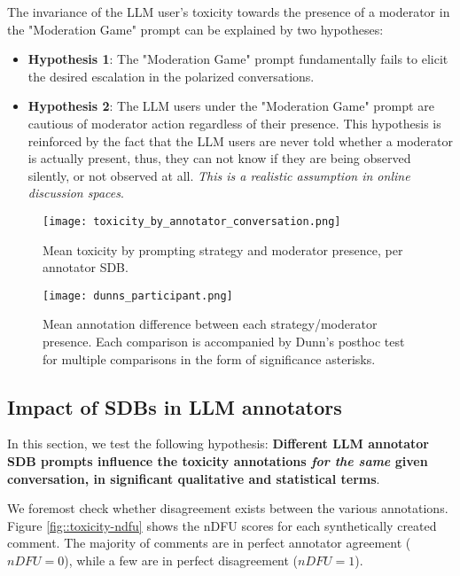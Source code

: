 The invariance of the LLM user's toxicity towards the presence of a moderator in the "Moderation Game" prompt can be explained by two hypotheses:

\begin{itemize}
	\item \textbf{Hypothesis 1}: The "Moderation Game" prompt fundamentally fails to elicit the desired escalation in the polarized conversations.
	
	\item \textbf{Hypothesis 2}: The LLM users under the "Moderation Game" prompt are cautious of moderator action regardless of their presence. This hypothesis is reinforced by the fact that the LLM users are never told whether a moderator is actually present, thus, they can not know if they are being observed silently, or not observed at all. \textit{This is a realistic assumption in online discussion spaces}.
\end{itemize}

\begin{figure}
	\centering
	\texttt{[image: toxicity\_by\_annotator\_conversation.png]}
	\caption{Mean toxicity by prompting strategy and moderator presence, per annotator \ac{SDB}.}
	\label{fig::toxicity-strategy}
\end{figure}

\begin{figure}
	\centering
	\texttt{[image: dunns\_participant.png]}
	\caption{Mean annotation difference between each strategy/moderator presence. Each comparison is accompanied by Dunn's posthoc test for multiple comparisons in the form of significance asterisks.}
	\label{fig::toxicity-strategy-significance}
\end{figure}



\subsection{Impact of \acp{SDB} in LLM annotators}
\label{ssec:evaluation:annotators}

In this section, we test the following hypothesis: \textbf{Different LLM annotator \ac{SDB} prompts influence the toxicity annotations \textit{for the same} given conversation, in significant qualitative and statistical terms}. 

We foremost check whether disagreement exists between the various annotations. Figure \ref{fig::toxicity-ndfu} shows the  \ac{nDFU}\cite{pavlopoulos-likas-2024-polarized} scores for each synthetically created comment. The majority of comments are in perfect annotator agreement ($nDFU=0$), while a few are in perfect disagreement ($nDFU=1$).

